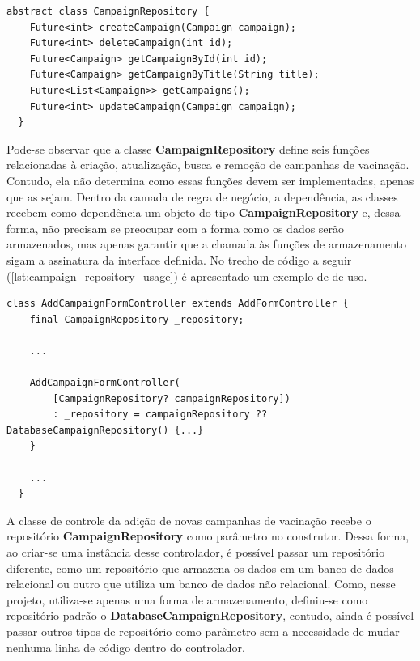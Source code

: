 \begin{lstlisting}[caption={Interface \textbf{CampaignRepository}}, label={lst:campaign_repository}]
  abstract class CampaignRepository {
    Future<int> createCampaign(Campaign campaign);
    Future<int> deleteCampaign(int id);
    Future<Campaign> getCampaignById(int id);
    Future<Campaign> getCampaignByTitle(String title);
    Future<List<Campaign>> getCampaigns();
    Future<int> updateCampaign(Campaign campaign);
  }
\end{lstlisting}

Pode-se observar que a classe \textbf{CampaignRepository} define seis funções relacionadas à criação, atualização, busca e remoção de campanhas de vacinação. Contudo, ela não determina como essas funções devem ser implementadas, apenas que as sejam. Dentro da camada de regra de negócio, a dependência, as classes recebem como dependência um objeto do tipo \textbf{CampaignRepository} e, dessa forma, não precisam se preocupar com a forma como os dados serão armazenados, mas apenas garantir que a chamada às funções de armazenamento sigam a assinatura da interface definida. No trecho de código a seguir (\ref{lst:campaign_repository_usage}) é apresentado um exemplo de de uso.

\begin{lstlisting}[caption={Exemplo de uso da interface \textbf{CampaignRepository}}, label={lst:campaign_repository_usage}]
  class AddCampaignFormController extends AddFormController {
    final CampaignRepository _repository;
    
    ...
  
    AddCampaignFormController(
        [CampaignRepository? campaignRepository])
        : _repository = campaignRepository ?? DatabaseCampaignRepository() {...}
    }

    ...
  }
\end{lstlisting}

A classe de controle da adição de novas campanhas de vacinação recebe o repositório \textbf{CampaignRepository} como parâmetro no construtor. Dessa forma, ao criar-se uma instância desse controlador, é possível passar um repositório diferente, como um repositório que armazena os dados em um banco de dados relacional ou outro que utiliza um banco de dados não relacional. Como, nesse projeto, utiliza-se apenas uma forma de armazenamento, definiu-se como repositório padrão o \textbf{DatabaseCampaignRepository}, contudo, ainda é possível passar outros tipos de repositório como parâmetro sem a necessidade de mudar nenhuma linha de código dentro do controlador.

